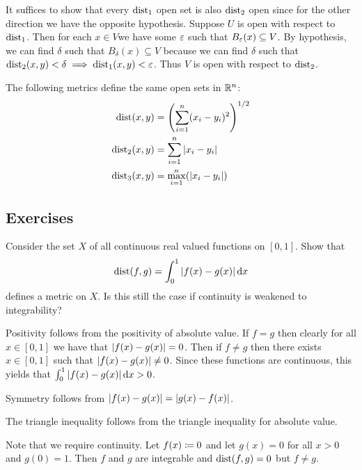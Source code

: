 \documentclass[letterpaper, 11pt, oneside]{book}
\begin{document}
\begin{pf}
  It suffices to show that every $\operatorname{dist}_{1}$ open set is also $\operatorname{dist}_{2}$ open since for the other direction we have the opposite hypothesis.
  Suppose $U$ is open with respect to $\operatorname{dist}_{1}$.
  Then for each $x \in V $we have some $\varepsilon$ such that $B_{\varepsilon}(x) \subseteq V$.
  By hypothesis, we can find $\delta$ such that $B_{\delta}(x) \subseteq V$ because we can find $\delta$ such that $\operatorname{dist}_{2}(x, y) < \delta \implies \operatorname{dist}_{1}(x, y) < \varepsilon$.
  Thus $V$ is open with respect to $\operatorname{dist}_{2}$.
\end{pf}

\begin{cor}
  The following metrics define the same open sets in $\mathbb{R}^{n}$:
  \begin{align*}
    \dist(x, y) &= \pqty{\sum_{i = 1}^{n} (x_{i} - y_{i})^{2}}^{1/2} \\
    \dist_{2}(x, y) &= \sum_{i = 1}^{n} \abs{x_{i} - y_{i}} \\
    \dist_{3}(x, y) &= \max_{i = 1}^{n} (\abs{x_{i} - y_{i}})
  \end{align*}
\end{cor}

\clearpage

\subsection*{Exercises}

\begin{exercise}
  Consider the set $X$ of all continuous real valued functions on $[0, 1]$.
  Show that
  \[
    \operatorname{dist}(f, g) = \int_{0}^{1} \abs{f(x) - g(x)} \dd{x}
  \]
  defines a metric on $X$.
  Is this still the case if continuity is weakened to integrability?
\end{exercise}
\begin{pf}
  Positivity follows from the positivity of absolute value.
  If $f = g$ then clearly for all $x \in [0, 1]$ we have that $\abs{f(x) - g(x)} = 0$.
  Then if $f \neq g$ then there exists $x \in [0, 1]$ such that $\abs{f(x) - g(x)} \neq 0$.
  Since these functions are continuous, this yields that $\int_{0}^{1} \abs{f(x) - g(x)} \dd{x} > 0$.

  Symmetry follows from $\abs{f(x) - g(x)} = \abs{g(x) - f(x)}$.

  The triangle inequality follows from the triangle inequality for absolute value.

  Note that we require continuity.
  Let $f(x) \coloneqq 0$ and let $g(x) = 0$ for all $x > 0$ and $g(0) = 1$.
  Then $f$ and $g$ are integrable and $\operatorname{dist}(f, g) = 0$ but $f \neq g$.
\end{pf}
\end{document}
